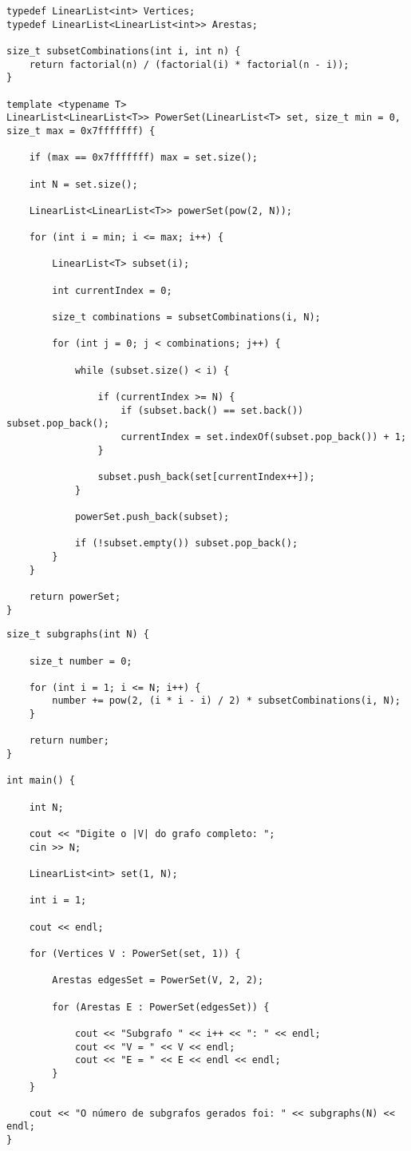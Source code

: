 \documentclass[12pt]{article}
\begin{document}
\begin{verbatim}
typedef LinearList<int> Vertices;
typedef LinearList<LinearList<int>> Arestas;

size_t subsetCombinations(int i, int n) {
	return factorial(n) / (factorial(i) * factorial(n - i));
}

template <typename T>
LinearList<LinearList<T>> PowerSet(LinearList<T> set, size_t min = 0, size_t max = 0x7fffffff) {

	if (max == 0x7fffffff) max = set.size();

	int N = set.size();

	LinearList<LinearList<T>> powerSet(pow(2, N));

	for (int i = min; i <= max; i++) {

		LinearList<T> subset(i);

		int currentIndex = 0;

		size_t combinations = subsetCombinations(i, N);

		for (int j = 0; j < combinations; j++) {

			while (subset.size() < i) {

				if (currentIndex >= N) {
					if (subset.back() == set.back()) subset.pop_back();
					currentIndex = set.indexOf(subset.pop_back()) + 1;
				}

				subset.push_back(set[currentIndex++]);
			}

			powerSet.push_back(subset);

			if (!subset.empty()) subset.pop_back();
		}
	}

	return powerSet;
}
\end{verbatim}

\newpage %

\begin{verbatim}
size_t subgraphs(int N) {

	size_t number = 0;

	for (int i = 1; i <= N; i++) {
		number += pow(2, (i * i - i) / 2) * subsetCombinations(i, N);
	}

	return number;
}

int main() {

	int N;

	cout << "Digite o |V| do grafo completo: ";
	cin >> N;

	LinearList<int> set(1, N);

	int i = 1;

	cout << endl;

	for (Vertices V : PowerSet(set, 1)) {

		Arestas edgesSet = PowerSet(V, 2, 2);

		for (Arestas E : PowerSet(edgesSet)) {

			cout << "Subgrafo " << i++ << ": " << endl;
			cout << "V = " << V << endl;
			cout << "E = " << E << endl << endl;
		}
	}

	cout << "O número de subgrafos gerados foi: " << subgraphs(N) << endl;
}
\end{verbatim}
\end{document}
